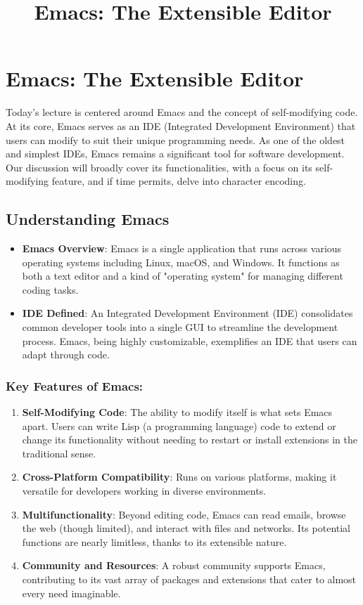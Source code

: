 \documentclass{article}
\title{Emacs: The Extensible Editor}
\author{}
\date{}
\begin{document}
\maketitle

\tableofcontents

\section{Emacs: The Extensible Editor}

Today's lecture is centered around Emacs and the concept of self-modifying code. At its core, Emacs serves as an IDE (Integrated Development Environment) that users can modify to suit their unique programming needs. As one of the oldest and simplest IDEs, Emacs remains a significant tool for software development. Our discussion will broadly cover its functionalities, with a focus on its self-modifying feature, and if time permits, delve into character encoding.

\subsection{Understanding Emacs}

\begin{itemize}
    \item \textbf{Emacs Overview}: Emacs is a single application that runs across various operating systems including Linux, macOS, and Windows. It functions as both a text editor and a kind of "operating system" for managing different coding tasks.
    \item \textbf{IDE Defined}: An Integrated Development Environment (IDE) consolidates common developer tools into a single GUI to streamline the development process. Emacs, being highly customizable, exemplifies an IDE that users can adapt through code.
\end{itemize}

\subsubsection{Key Features of Emacs:}

\begin{enumerate}
    \item \textbf{Self-Modifying Code}: The ability to modify itself is what sets Emacs apart. Users can write Lisp (a programming language) code to extend or change its functionality without needing to restart or install extensions in the traditional sense.
    \item \textbf{Cross-Platform Compatibility}: Runs on various platforms, making it versatile for developers working in diverse environments.
    \item \textbf{Multifunctionality}: Beyond editing code, Emacs can read emails, browse the web (though limited), and interact with files and networks. Its potential functions are nearly limitless, thanks to its extensible nature.
    \item \textbf{Community and Resources}: A robust community supports Emacs, contributing to its vast array of packages and extensions that cater to almost every need imaginable.
\end{enumerate}
\end{document}
